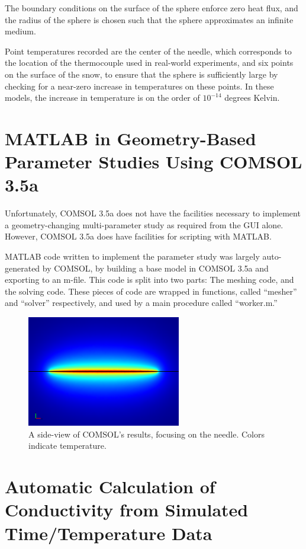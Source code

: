 The boundary conditions on the surface of the sphere enforce zero heat flux,
and the radius of the sphere is chosen such that the sphere approximates an
infinite medium.

Point temperatures recorded are the center of the needle, which corresponds to
the location of the thermocouple used in real-world experiments, and six points
on the surface of the snow, to ensure that the sphere is sufficiently large by
checking for a near-zero increase in temperatures on these points. In these
models, the increase in temperature is on the order of \(10^{-14}\) degrees
Kelvin.

\section{MATLAB in Geometry-Based Parameter Studies Using COMSOL 3.5a}
\label{sec:numerical-np:matlab}

Unfortunately, COMSOL 3.5a does not have the facilities necessary to implement a
geometry-changing multi-parameter study as required from the GUI alone. However,
COMSOL 3.5a does have facilities for scripting with MATLAB.

MATLAB code written to implement the parameter study was largely auto-generated
by COMSOL, by building a base model in COMSOL 3.5a and exporting to an m-file.
This code is split into two parts: The meshing code, and the solving code.
These pieces of code are wrapped in functions, called ``mesher'' and ``solver''
respectively, and used by a main procedure called ``worker.m.''

\begin{figure}[h]
\centering
\includegraphics[width=0.6\textwidth]{fig/35892_elem_1097s.png}
\caption{A side-view of COMSOL's results, focusing on the needle. Colors indicate temperature.}
\label{fig:comsol}
\end{figure}

\section{Automatic Calculation of Conductivity from Simulated Time/Temperature Data}

